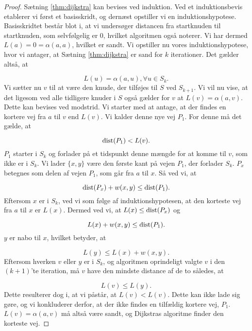 \begin{proof}
Sætning \ref{thm:dijkstra} kan bevises ved induktion. Ved et induktionsbevis etablerer vi først et basisskridt, og dernæst opstiller vi en induktionshypotese. Basisskridtet består blot i, at vi undersøger distancen fra startknuden til startknuden, som selvfølgelig er 0, hvilket algoritmen også noterer. Vi har dermed $L(a)=0= \alpha(a,a)$, hvilket er sandt.
Vi opstiller nu vores induktionshypotese, hvor vi antager, at Sætning \ref{thm:dijkstra} er sand for $k$ iterationer. Det gælder altså, at

\begin{equation}
L(u) = \alpha(a,u), \forall u \in S_k. 
\end{equation} %
Vi sætter nu $v$ til at være den knude, der tilføjes til $S$ ved $S_{k+1}$. Vi vil nu vise, at det ligesom ved alle tidligere knuder i $S$ også gælder for $v$ at $L(v)=\alpha(a,v)$. Dette kan bevises ved modstrid. Vi starter med at antage, at der findes en kortere vej fra $a$ til $v$ end $L(v)$. Vi kalder denne nye vej $P_1$. For denne må det gælde, at

\begin{equation}
\textrm{dist}(P_1)<L(v).
\end{equation} %
$P_1$ starter i $S_k$ og forlader på et tidspunkt denne mængde for at komme til $v$, som ikke er i $S_k$. Vi lader $\{x,y\}$ være den første kant på vejen $P_1$, der forlader $S_k$. $P_x$ betegnes som delen af vejen $P_1$, som går fra $a$ til $x$. Så ved vi, at

\begin{equation}
\textrm{dist}(P_x)+w(x,y) \leq \textrm{dist}(P_1).
\end{equation}
Eftersom $x$ er i $S_k$, ved vi som følge af induktionshypotesen, at den korteste vej fra $a$ til $x$ er $L(x)$. Dermed ved vi, at $L(x) \leq \textrm{dist}(P_x)$ og

\begin{equation}
L(x) + w(x,y) \leq \textrm{dist}(P_1).
\end{equation}
$y$ er nabo til $x$, hvilket betyder, at

\begin{equation}
L(y) \leq L(x) + w(x,y).
\end{equation}
Eftersom hverken $v$ eller $y$ er i $S_k$, og algoritmen oprindeligt valgte $v$ i den $(k+1)$'te iteration, må $v$ have den mindste distance af de to således, at

\begin{equation}
L(v) \leq L(y).
\end{equation}
Dette resulterer dog i, at vi påstår, at $L(v) < L(v)$. Dette kan ikke lade sig gøre, og vi konkluderer derfor, at der ikke findes en tilfældig kortere vej, $P_1$. $L(v)=\alpha(a,v)$ må altså være sandt, og Dijkstras algoritme finder den korteste vej.
\end{proof}
